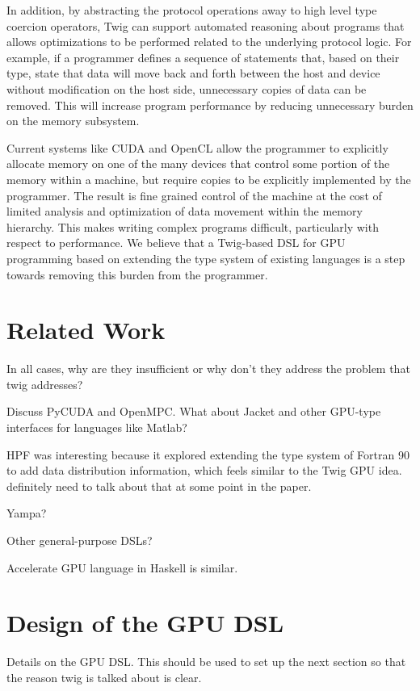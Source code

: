 \documentclass[11pt]{article}
\begin{document}
In addition, by abstracting the protocol operations away to high level type
coercion operators, Twig can support automated reasoning about programs that
allows optimizations to be performed related to the underlying protocol logic.
For example, if a programmer defines a sequence of statements that, based on
their type, state that data will move back and forth between the host and
device without modification on the host side, unnecessary copies of data can
be removed. This will increase program performance by reducing unnecessary
burden on the memory subsystem.

Current systems like CUDA and OpenCL allow the programmer to explicitly
allocate memory on one of the many devices that control some portion of the
memory within a machine, but require copies to be explicitly implemented by
the programmer. The result is fine grained control of the machine at the cost
of limited analysis and optimization of data movement within the memory
hierarchy. This makes writing complex programs difficult, particularly with
respect to performance. We believe that a Twig-based DSL for GPU programming
based on extending the type system of existing languages is a step towards
removing this burden from the programmer.

\section{Related Work}

In all cases, why are they insufficient or why don't they address the
problem that twig addresses?

Discuss PyCUDA and OpenMPC. What about Jacket and other GPU-type interfaces
for languages like Matlab?

HPF was interesting because it explored extending the type system of Fortran
90 to add data distribution information, which feels similar to the Twig GPU
idea. definitely need to talk about that at some point in the paper.

Yampa?

Other general-purpose DSLs?

Accelerate GPU language in Haskell is similar.  

\section{Design of the GPU DSL}

Details on the GPU DSL.  This should be used to set up the next section so
that the reason twig is talked about is clear.
\end{document}
